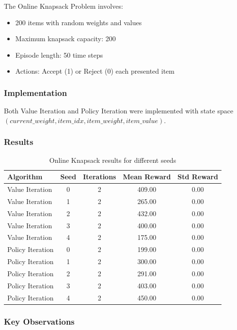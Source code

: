 \documentclass[10pt,a4paper]{article}
\begin{document}
The Online Knapsack Problem involves:
\begin{itemize}
    \item 200 items with random weights and values
    \item Maximum knapsack capacity: 200
    \item Episode length: 50 time steps
    \item Actions: Accept (1) or Reject (0) each presented item
\end{itemize}

\subsubsection{Implementation}

Both Value Iteration and Policy Iteration were implemented with state space $(current\_weight, item\_idx, item\_weight, item\_value)$.

\subsubsection{Results}

\begin{table}[H]
\centering
\caption{Online Knapsack results for different seeds}
\begin{tabular}{lcccc}
\toprule
Algorithm & Seed & Iterations & Mean Reward & Std Reward \\
\midrule
Value Iteration & 0 & 2 & 409.00 & 0.00 \\
Value Iteration & 1 & 2 & 265.00 & 0.00 \\
Value Iteration & 2 & 2 & 432.00 & 0.00 \\
Value Iteration & 3 & 2 & 400.00 & 0.00 \\
Value Iteration & 4 & 2 & 175.00 & 0.00 \\
Policy Iteration & 0 & 2 & 199.00 & 0.00 \\
Policy Iteration & 1 & 2 & 300.00 & 0.00 \\
Policy Iteration & 2 & 2 & 291.00 & 0.00 \\
Policy Iteration & 3 & 2 & 403.00 & 0.00 \\
Policy Iteration & 4 & 2 & 450.00 & 0.00 \\
\bottomrule
\end{tabular}
\end{table}

\subsubsection{Key Observations}
\end{document}
